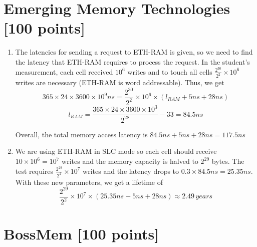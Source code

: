 \documentclass[a4paper]{article}
\begin{document}
\section{Emerging Memory Technologies [100 points]}

\begin{enumerate}[label=\alph*)]
    \item The latencies for sending a request to ETH-RAM is given, so we need to
        find the latency that ETH-RAM requires to process the request. In the
        student's measurement, each cell received $10^6$ writes and to touch
        all cells $\frac{2^{30}}{2^2} \times 10^6$ writes are necessary (ETH-RAM
        is word addressable). Thus, we get
        \[365 \times 24 \times 3600 \times 10^9ns = \frac{2^{30}}{2^2} \times 10^6 \times (l_{RAM} + 5ns + 28ns)\]
        \[l_{RAM} = \frac{365 \times 24 \times 3600 \times 10^3}{2^{28}} - 33
        = 84.5ns\]

        Overall, the total memory access latency is $84.5ns + 5ns + 28ns
        = 117.5ns$

    \item We are using ETH-RAM in SLC mode so each cell should receive $10
        \times 10^6 = 10^7$ writes and the memory capacity is halved to $2^{29}$
        bytes. The test requires $\frac{2^{29}}{2^2} \times 10^7$ writes and the
        latency drops to $0.3 \times 84.5ns = 25.35ns$. With these new
        parameters, we get a lifetime of
        \[ \frac{2^{29}}{2^2} \times 10^7 \times (25.35ns + 5ns + 28ns) \approx
        2.49 \, years \]
\end{enumerate}

\section{BossMem [100 points]}
\end{document}
